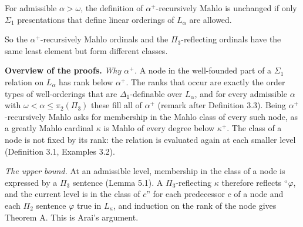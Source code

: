 \documentclass[11pt]{article}
\begin{document}
\begin{statement} For admissible $\alpha > \omega$, the definition of $\alpha^+$-recursively Mahlo is unchanged if only
$\Sigma_1$ presentations that define linear orderings of $L_{\alpha}$ are allowed.
\end{statement}

So the $\alpha^+$-recursively Mahlo ordinals and the $\Pi_3$-reflecting ordinals have the same least element but
form different classes.

\textbf{Overview of the proofs.} \emph{Why $\alpha^+$.} A node in the well-founded part of a $\Sigma_1$ relation on $L_{\alpha}$ has rank below
$\alpha^+$. The ranks that occur are exactly the order types of well-orderings that are $\Delta_1$-definable over
$L_{\alpha}$, and for every admissible $\alpha$ with $\omega < \alpha \le \pi_2(\Pi_3)$ these fill all of
$\alpha^+$ (remark after Definition 3.3). Being $\alpha^+$-recursively Mahlo asks for membership in the Mahlo
class of every such node, as a greatly Mahlo cardinal $\kappa$ is Mahlo of every degree below $\kappa^+$. The class
of a node is not fixed by its rank: the relation is evaluated again at each smaller level (Definition 3.1, Examples
3.2).

\emph{The upper bound.} At an admissible level, membership in the class of a node is expressed by a $\Pi_3$ sentence
(Lemma 5.1). A $\Pi_3$-reflecting $\kappa$ therefore reflects ``$\varphi$, and the current level is in the class of
$c$'' for each predecessor $c$ of a node and each $\Pi_2$ sentence $\varphi$ true in $L_{\kappa}$, and induction on
the rank of the node gives Theorem A. This is Arai's argument.
\end{document}
